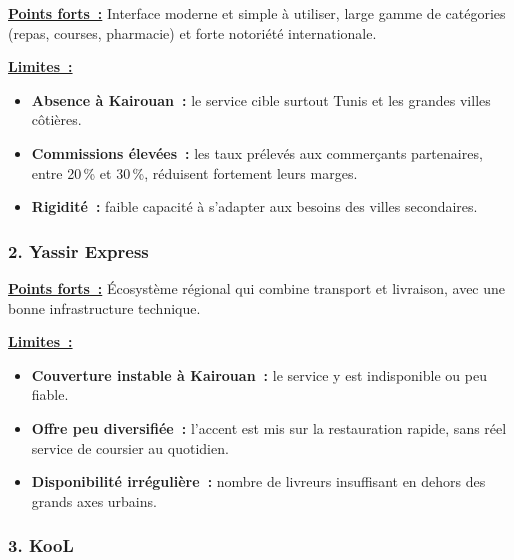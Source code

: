 \documentclass[12pt,fleqn,a4paper]{report}
\begin{document}
\begin{justify}
\noindent \textbf{\underline{Points forts~:}}
Interface moderne et simple à utiliser, large gamme de catégories (repas, courses, pharmacie) et forte notoriété internationale.

\vspace{0.2cm}
\noindent \textbf{\underline{Limites~:}}
\begin{itemize}
    \item \textbf{Absence à Kairouan~:} le service cible surtout Tunis et les grandes villes côtières.
    \item \textbf{Commissions élevées~:} les taux prélevés aux commerçants partenaires, entre 20\,\% et 30\,\%, réduisent fortement leurs marges.
    \item \textbf{Rigidité~:} faible capacité à s'adapter aux besoins des villes secondaires.
\end{itemize}

\vspace{0.4cm}

\subsubsection*{\Large \textbf{2. Yassir Express}}
\vspace{0.2cm}

\noindent \textbf{\underline{Points forts~:}}
Écosystème régional qui combine transport et livraison, avec une bonne infrastructure technique.

\vspace{0.2cm}
\noindent \textbf{\underline{Limites~:}}
\begin{itemize}
    \item \textbf{Couverture instable à Kairouan~:} le service y est indisponible ou peu fiable.
    \item \textbf{Offre peu diversifiée~:} l'accent est mis sur la restauration rapide, sans réel service de coursier au quotidien.
    \item \textbf{Disponibilité irrégulière~:} nombre de livreurs insuffisant en dehors des grands axes urbains.
\end{itemize}

\vspace{0.4cm}

\subsubsection*{\Large \textbf{3. KooL}}
\vspace{0.2cm}


\end{justify}
\end{document}
